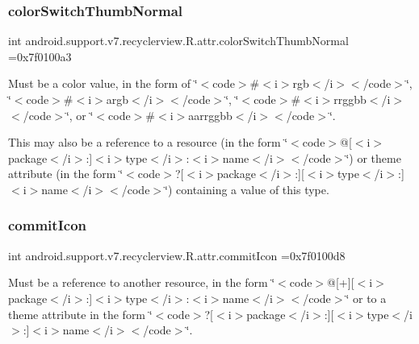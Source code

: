 \subsubsection{\texorpdfstring{color\+Switch\+Thumb\+Normal}{colorSwitchThumbNormal}}
{\footnotesize\ttfamily int android.\+support.\+v7.\+recyclerview.\+R.\+attr.\+color\+Switch\+Thumb\+Normal =0x7f0100a3\hspace{0.3cm}{\ttfamily [static]}}

Must be a color value, in the form of \char`\"{}$<$code$>$\#$<$i$>$rgb$<$/i$>$$<$/code$>$\char`\"{}, \char`\"{}$<$code$>$\#$<$i$>$argb$<$/i$>$$<$/code$>$\char`\"{}, \char`\"{}$<$code$>$\#$<$i$>$rrggbb$<$/i$>$$<$/code$>$\char`\"{}, or \char`\"{}$<$code$>$\#$<$i$>$aarrggbb$<$/i$>$$<$/code$>$\char`\"{}. 

This may also be a reference to a resource (in the form \char`\"{}$<$code$>$@\mbox{[}$<$i$>$package$<$/i$>$\+:\mbox{]}$<$i$>$type$<$/i$>$\+:$<$i$>$name$<$/i$>$$<$/code$>$\char`\"{}) or theme attribute (in the form \char`\"{}$<$code$>$?\mbox{[}$<$i$>$package$<$/i$>$\+:\mbox{]}\mbox{[}$<$i$>$type$<$/i$>$\+:\mbox{]}$<$i$>$name$<$/i$>$$<$/code$>$\char`\"{}) containing a value of this type. \mbox{\label{classandroid_1_1support_1_1v7_1_1recyclerview_1_1R_1_1attr_a4a9d73691021aec95bdf438cb664df4d}} 
\subsubsection{\texorpdfstring{commit\+Icon}{commitIcon}}
{\footnotesize\ttfamily int android.\+support.\+v7.\+recyclerview.\+R.\+attr.\+commit\+Icon =0x7f0100d8\hspace{0.3cm}{\ttfamily [static]}}

Must be a reference to another resource, in the form \char`\"{}$<$code$>$@\mbox{[}+\mbox{]}\mbox{[}$<$i$>$package$<$/i$>$\+:\mbox{]}$<$i$>$type$<$/i$>$\+:$<$i$>$name$<$/i$>$$<$/code$>$\char`\"{} or to a theme attribute in the form \char`\"{}$<$code$>$?\mbox{[}$<$i$>$package$<$/i$>$\+:\mbox{]}\mbox{[}$<$i$>$type$<$/i$>$\+:\mbox{]}$<$i$>$name$<$/i$>$$<$/code$>$\char`\"{}. \mbox{\label{classandroid_1_1support_1_1v7_1_1recyclerview_1_1R_1_1attr_ac4b8375e0931677457a5c96243d663b5}} 
